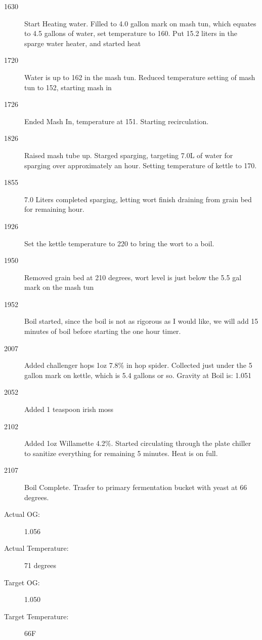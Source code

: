 \FloatBarrier{}
\begin{description}
    \item[1630] Start Heating water.  Filled to 4.0 gallon mark on mash tun, which equates to 4.5 gallons of water, set temperature to 160.  Put 15.2 liters in the sparge water heater, and started heat
    \item[1720] Water is up to 162 in the mash tun. Reduced temperature setting of mash tun to 152, starting mash in
    \item[1726] Ended Mash In, temperature at 151.  Starting recirculation.
    \item[1826] Raised mash tube up. Starged sparging, targeting 7.0L of water for sparging over approximately an hour.  Setting temperature of kettle to 170.
    \item[1855] 7.0 Liters completed sparging, letting wort finish draining from grain bed for remaining hour.
    \item[1926] Set the kettle temperature to 220 to bring the wort to a boil.
    \item[1950] Removed grain bed at 210 degrees, wort level is just below the 5.5 gal mark on the mash tun
    \item[1952] Boil started, since the boil is not as rigorous as I would like, we will add 15 minutes of boil before starting the one hour timer.
    \item[2007] Added challenger hops 1oz 7.8\% in hop spider.  Collected just under the 5 gallon mark on kettle, which is 5.4 gallons or so.  Gravity at Boil is: 1.051
    \item[2052] Added 1 teaspoon irish moss
    \item[2102] Added 1oz Willamette 4.2\%.  Started circulating through the plate chiller to sanitize everything for remaining 5 minutes.  Heat is on full.
    \item[2107] Boil Complete.  Trasfer to primary fermentation bucket with yeast at 66 degrees.
    \item[Actual OG:] 1.056
    \item[Actual Temperature:] 71 degrees
    \item[Target OG:] 1.050
    \item[Target Temperature:] 66F
\end{description}

\def\todaysdate{20191201}
\newday{\todaysdate}\label{\todaysdate}


